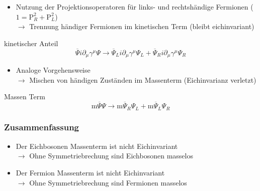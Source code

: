 \documentclass[xcolor=dvipsnames]{beamer}
\begin{document}
\begin{frame}
\begin{itemize}
\item Nutzung der Projektionsoperatoren für links- und rechtshändige Fermionen ($1=\text{P}_{R}^{2}+ \text{P}_{L}^{2}$) \\ $\rightarrow $ Trennung händiger Fermionen im kinetischen Term (bleibt eichinvariant)

\end{itemize}
\begin{block}{kinetischer Anteil}
\begin{equation*}
\overline{\Psi} i \partial_{\mu} \gamma^{\mu} \Psi  \rightarrow \overline{\Psi}_{L} i \partial_{\mu} \gamma^{\mu} \Psi_{L} +\overline{\Psi}_{R} i \partial_{\mu} \gamma^{\mu} \Psi_{R} 
\end{equation*}
\end{block}

\begin{itemize}
\item Analoge Vorgehensweise \\$\rightarrow$ Mischen von händigen Zuständen im Massenterm  (Eichinvarianz verletzt)
\end{itemize}

\begin{block}{Massen Term}
\begin{equation*}
\text{m}\overline{\Psi} \Psi  \rightarrow \text{m}\overline{\Psi}_{R} \Psi_{L} +\text{m}\overline{\Psi}_{L} \Psi_{R} 
\end{equation*}
\end{block}
\end{frame}
\begin{frame}
\frametitle{Zusammenfassung}
\begin{itemize}
\item Der Eichbosonen Massenterm ist nicht Eichinvariant   \\$\rightarrow$ Ohne Symmetriebrechung sind Eichbosonen masselos
\item Der Fermion Massenterm ist nicht Eichinvariant  \\$\rightarrow$ Ohne Symmetriebrechung sind Fermionen masselos
\end{itemize}
\end{frame}
\end{document}
